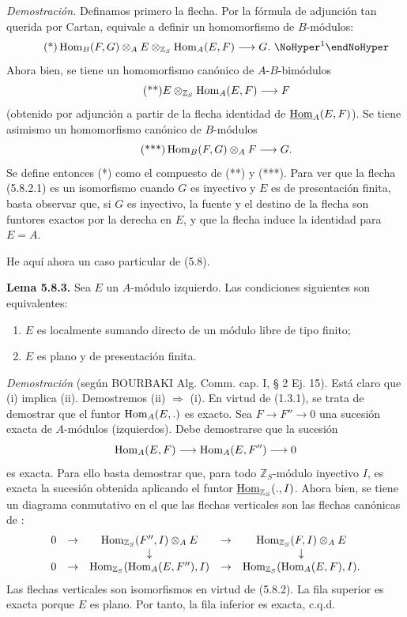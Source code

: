 \emph{Demostración.} Definamos primero la flecha. Por la fórmula de adjunción tan querida por Cartan, equivale a definir un homomorfismo de \(B\)-módulos:
\begin{equation}\tag{*}
  \Hom_B(F,G)\otimes_A E\otimes_{\mathbb Z_S}\Hom_A(E,F)
  \longrightarrow G.\text{\sganohyperfootnotemark}
\end{equation}
Ahora bien, se tiene un homomorfismo canónico de \(A\)-\(B\)-bimódulos
\begin{equation}\tag{**}
  E\otimes_{\mathbb Z_S}\operatorname{Hom}_A(E,F)
  \longrightarrow F
\end{equation}
(obtenido por adjunción a partir de la flecha identidad de \(\underline{\operatorname{Hom}}_A(E,F)\)). Se tiene asimismo un homomorfismo canónico de \(B\)-módulos
\begin{equation}\tag{***}
  \operatorname{Hom}_B(F,G)\otimes_A F\longrightarrow G.
\end{equation}
Se define entonces (*) como el compuesto de (**) y (***). Para ver que la flecha (5.8.2.1) es un isomorfismo cuando \(G\) es inyectivo y \(E\) es de presentación finita, basta observar que, si \(G\) es inyectivo, la fuente y el destino de la flecha son funtores exactos por la derecha en \(E\), y que la flecha induce la identidad para \(E=A\).

He aquí ahora un caso particular de (5.8).

\textbf{Lema 5.8.3.} Sea \(E\) un \(A\)-módulo izquierdo. Las condiciones siguientes son equivalentes:
\begin{enumerate}[label=(\roman*)]
\item \(E\) es localmente sumando directo de un módulo libre de tipo finito;
\item \(E\) es plano y de presentación finita.
\end{enumerate}

\emph{Demostración} (según BOURBAKI Alg. Comm. cap. I, § 2 Ej. 15). Está claro que (i) implica (ii). Demostremos (ii) \(\Rightarrow\) (i). En virtud de (1.3.1), se trata de demostrar que el funtor \(\operatorname{Hom}_A(E,.)\) es exacto. Sea \(F\longrightarrow F''\longrightarrow 0\) una sucesión exacta de \(A\)-módulos (izquierdos). Debe demostrarse que la sucesión
\[
  \operatorname{Hom}_A(E,F)\longrightarrow \operatorname{Hom}_A(E,F'')\longrightarrow 0
\]
es exacta. Para ello basta demostrar que, para todo \(\mathbb Z_S\)-módulo inyectivo \(I\), es exacta la sucesión obtenida aplicando el funtor \(\underline{\operatorname{Hom}}_{\mathbb Z_S}(.,I)\). Ahora bien, se tiene un diagrama conmutativo en el que las flechas verticales son las flechas canónicas de :
\[
\begin{array}{ccccccccc}
0&\to&\operatorname{Hom}_{\mathbb Z_S}(F'',I)\otimes_A E&\to&\operatorname{Hom}_{\mathbb Z_S}(F,I)\otimes_A E\\
&&\downarrow&&\downarrow\\
0&\to&\operatorname{Hom}_{\mathbb Z_S}(\operatorname{Hom}_A(E,F''),I)&\to&\operatorname{Hom}_{\mathbb Z_S}(\operatorname{Hom}_A(E,F),I).
\end{array}
\]
Las flechas verticales son isomorfismos en virtud de (5.8.2). La fila superior es exacta porque \(E\) es plano. Por tanto, la fila inferior es exacta, c.q.d.

